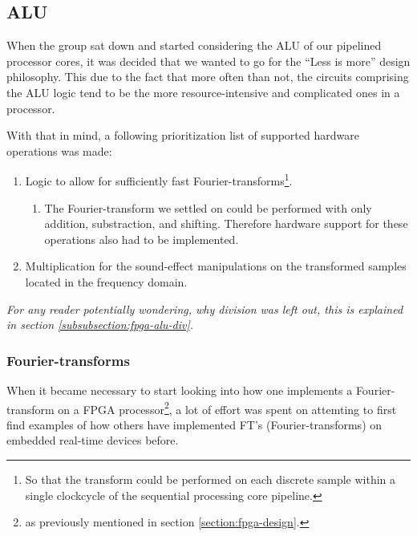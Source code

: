 \FloatBarrier
\subsection{ALU}\label{subsection:fpga-alu}

When the group sat down and started considering the ALU of our pipelined
processor cores, it was decided that we wanted to go for the ``Less is more''
design philosophy. This due to the fact that more often than not, the circuits
comprising the ALU logic tend to be the more resource-intensive and complicated
ones in a processor.

With that in mind, a following prioritization list of supported hardware
operations was made:
\begin{enumerate}
	\item Logic to allow for sufficiently fast Fourier-transforms\footnote{So
that the transform could be performed on each discrete sample within a single
clockcycle of the sequential processing core pipeline.}.
	\begin{enumerate}
		\item The Fourier-transform we settled on could be performed with only
addition, substraction, and shifting. Therefore hardware support for these
operations also had to be implemented.
	\end{enumerate}
	\item Multiplication for the sound-effect manipulations on the transformed
samples located in the frequency domain.
\end{enumerate}
\emph{For any reader potentially wondering, why division was left out, this is
explained in section \ref{subsubsection:fpga-alu-div}.}

\FloatBarrier
\subsubsection{Fourier-transforms}\label{subsubsection:fpga-alu-ft}

When it became necessary to start looking into how one implements a
Fourier-transform on a FPGA processor\footnote{as previously mentioned in section
\ref{section:fpga-design}.}, a lot of effort was spent on attemting to first
find examples of how others have implemented FT's (Fourier-transforms) on
embedded real-time devices before.

